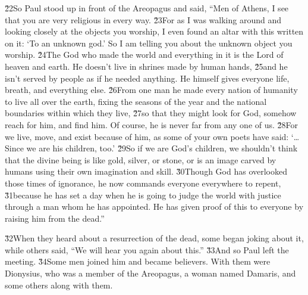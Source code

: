 \v{22}So Paul stood up in front of the Areopagus and said, ``Men of Athens, I see that you are very religious in every way. \v{23}For as I was walking around and looking closely at the objects you worship, I even found an altar with this written on it: `To an unknown god.' So I am telling you about the unknown object you worship. \v{24}The God who made the world and everything in it is the Lord of heaven and earth. He doesn't live in shrines made by human hands, \v{25}and he isn't served by people as if he needed anything. He himself gives everyone life, breath, and everything else. \v{26}From one man he made every nation of humanity to live all over the earth, fixing the seasons of the year and the national boundaries within which they live, \v{27}so that they might look for God, somehow reach for him, and find him. Of course, he is never far from any one of us. \v{28}For we live, move, and exist because of him, as some of your own poets have said: `{\ldots}Since we are his children, too.' \v{29}So if we are God's children, we shouldn't think that the divine being is like gold, silver, or stone, or is an image carved by humans using their own imagination and skill. \v{30}Though God has overlooked those times of ignorance, he now commands everyone everywhere to repent, \v{31}because he has set a day when he is going to judge the world with justice through a man whom he has appointed. He has given proof of this to everyone by raising him from the dead.''

\v{32}When they heard about a resurrection of the dead, some began joking about it, while others said, ``We will hear you again about this.'' \v{33}And so Paul left the meeting. \v{34}Some men joined him and became believers. With them were Dionysius, who was a member of the Areopagus, a woman named Damaris, and some others along with them.

